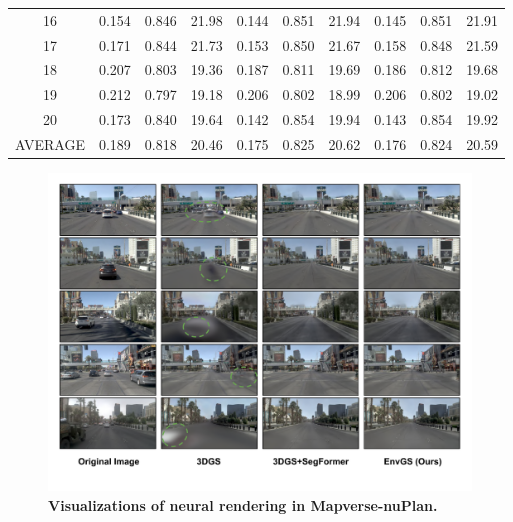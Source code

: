\begin{table}[ht]
\begin{tabular}{@{}c|ccc|ccc|ccc@{}}
16                                 & 0.154                     & 0.846                     & 21.98     & 0.144                      & 0.851                     & 21.94    & 0.145                     & 0.851                     & 21.91     \\
17                                 & 0.171                     & 0.844                     & 21.73     & 0.153                      & 0.850                     & 21.67    & 0.158                     & 0.848                     & 21.59     \\
18                                 & 0.207                     & 0.803                     & 19.36     & 0.187                      & 0.811                     & 19.69    & 0.186                     & 0.812                     & 19.68     \\
19                                 & 0.212                     & 0.797                     & 19.18     & 0.206                      & 0.802                     & 18.99    & 0.206                     & 0.802                     & 19.02     \\
20                                 & 0.173                     & 0.840                     & 19.64     & 0.142                      & 0.854                     & 19.94    & 0.143                     & 0.854                     & 19.92     \\ \midrule
AVERAGE                            & 0.189                     & 0.818                     & 20.46     & 0.175                      & 0.825                     & 20.62    & 0.176                     & 0.824                     & 20.59     \\ \bottomrule
\end{tabular}
\end{table}

\begin{figure}[ht]
\vspace{1mm}
    \centering
    \includegraphics[width=0.925\linewidth]{figs_compressed/nuplan-rendering_compressed.pdf}
    \caption{\textbf{Visualizations of neural rendering in Mapverse-nuPlan.}}
    \label{fig:nuplan-rendering-appendix}
\end{figure}


